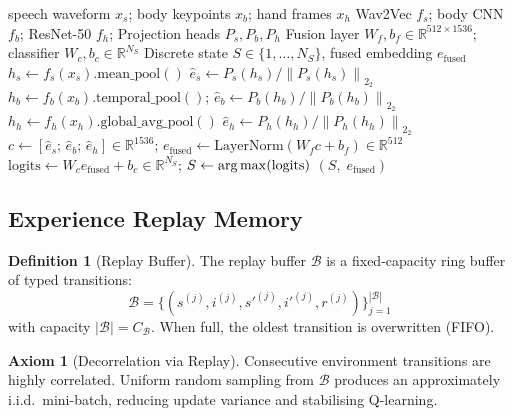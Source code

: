 \documentclass[12pt,a4paper]{article}
\theoremstyle{definition}
\newtheorem{definition}{Definition}[section]
\newtheorem{axiom}{Axiom}[section]
\theoremstyle{plain}
\theoremstyle{remark}
\newcommand{\R}{\mathbb{R}}
\newcommand{\Norm}[1]{\left\|#1\right\|_2}
\newcommand{\LN}{\mathrm{LayerNorm}}
\newcommand{\argmax}{\operatornamewithlimits{arg\,max}}
\begin{document}
\begin{algorithm}[H]
\caption{Sub-Classifier Forward Pass: Multimodal State Encoding}
\label{alg:subclassifier}
\begin{algorithmic}[1]
\Require speech waveform $x_s$; body keypoints $x_b$; hand frames $x_h$
\Require Wav2Vec $f_s$; body CNN $f_b$; ResNet-50 $f_h$; Projection heads $P_s, P_b, P_h$
\Require Fusion layer $W_f, b_f \in \R^{512 \times 1536}$; classifier $W_c, b_c \in \R^{N_S}$
\Ensure Discrete state $S \in \{1,\ldots,N_S\}$, fused embedding $e_{\text{fused}}$
\State $h_s \gets f_s(x_s).\text{mean\_pool}()$ 
\State $\hat{e}_s \gets P_s(h_s) / \Norm{P_s(h_s)}_2$ 
\State $h_b \gets f_b(x_b).\text{temporal\_pool}()$; $\hat{e}_b \gets P_b(h_b) / \Norm{P_b(h_b)}_2$
\State $h_h \gets f_h(x_h).\text{global\_avg\_pool}()$ 
\State $\hat{e}_h \gets P_h(h_h) / \Norm{P_h(h_h)}_2$ \Comment{$[512]$}
\State $c \gets [\hat{e}_s;\, \hat{e}_b;\, \hat{e}_h] \in \R^{1536}$; $e_{\text{fused}} \gets \LN(W_f c + b_f) \in \R^{512}$
\State $\text{logits} \gets W_c e_{\text{fused}} + b_c \in \R^{N_S}$; $S \gets \argmax(\text{logits})$
\State \Return $(S,\; e_{\text{fused}})$
\end{algorithmic}
\end{algorithm}

\subsection{Experience Replay Memory}

\begin{definition}[Replay Buffer]
The replay buffer $\mathcal{B}$ is a fixed-capacity ring buffer of typed transitions:
\[
  \mathcal{B} = \{(s^{(j)}, i^{(j)}, {s'}^{(j)}, {i'}^{(j)}, r^{(j)})\}_{j=1}^{|\mathcal{B}|}
\]
with capacity $|\mathcal{B}| = C_{\mathcal{B}}$. When full, the oldest transition is overwritten (FIFO).
\end{definition}

\begin{axiom}[Decorrelation via Replay]
Consecutive environment transitions are highly correlated. Uniform random sampling from $\mathcal{B}$ produces an approximately i.i.d.\ mini-batch, reducing update variance and stabilising Q-learning.
\end{axiom}
\end{document}

